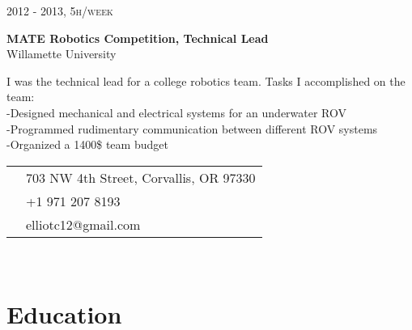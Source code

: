 \documentclass[10pt]{article} %
\begin{document}
{\begin{minipage}[t]{0.5\textwidth}
{\raggedleft\textsc{2012 - 2013, 5h/week}\par}

{\raggedright\large \textbf{MATE Robotics Competition, Technical Lead}\\
{Willamette University}\\[5pt]}
\normalsize{I was the technical lead for a college robotics team. Tasks I accomplished on the team:}\\
\hspace*{0.2in}-Designed mechanical and electrical systems for an underwater ROV\\
\hspace*{0.2in}-Programmed rudimentary communication between different ROV systems\\
\hspace*{0.2in}-Organized a 1400\$ team budget\\




\end{minipage} %
\hfill
\begin{minipage}[t]{0.44\textwidth} %
\vspace{0pt} %


\colorbox{shade}{\textcolor{text1}{
\begin{tabular}{c|p{7cm}}
\raisebox{-4pt}{\textifsymbol{18}} & 703 NW 4th Street, Corvallis, OR 97330\\ %
\raisebox{-3pt}{\Mobilefone} & +1 971 207 8193\\ %
\raisebox{-1pt}{\Letter} & elliotc12@gmail.com \\ %
\end{tabular}
}
}\\[10pt]


\section{Education} 


\end{minipage}}
\end{document}
